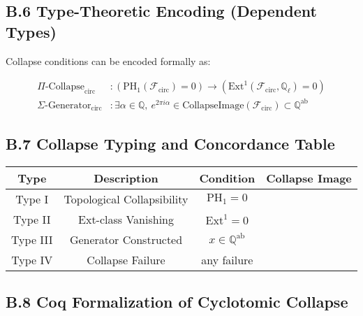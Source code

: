 \documentclass[11pt]{article}
\newcommand{\cmark}{\ding{51}}  %
\newcommand{\xmark}{\ding{55}}  %
\begin{document}
\subsection*{B.6 Type-Theoretic Encoding (Dependent Types)}

Collapse conditions can be encoded formally as:

\begin{align*}
\Pi\text{-Collapse}_{\mathrm{circ}} &: \left( \mathrm{PH}_1(\mathcal{F}_{\mathrm{circ}}) = 0 \right) \to \left( \mathrm{Ext}^1(\mathcal{F}_{\mathrm{circ}}, \mathbb{Q}_\ell) = 0 \right) \\
\Sigma\text{-Generator}_{\mathrm{circ}} &: \exists \alpha \in \mathbb{Q},\ e^{2\pi i \alpha} \in \text{CollapseImage}(\mathcal{F}_{\mathrm{circ}}) \subset \mathbb{Q}^{\mathrm{ab}}
\end{align*}

\subsection*{B.7 Collapse Typing and Concordance Table}

\begin{center}
\renewcommand{\arraystretch}{1.2}
\begin{tabular}{|c|c|c|c|}
\hline
\textbf{Type} & \textbf{Description} & \textbf{Condition} & \textbf{Collapse Image} \\
\hline
Type I & Topological Collapsibility & \( \mathrm{PH}_1 = 0 \) & \cmark \\
Type II & Ext-class Vanishing & \( \mathrm{Ext}^1 = 0 \) & \cmark \\
Type III & Generator Constructed & \( x \in \mathbb{Q}^{\mathrm{ab}} \) & \cmark \\
Type IV & Collapse Failure & any failure & \xmark \\
\hline
\end{tabular}
\end{center}

\subsection*{B.8 Coq Formalization of Cyclotomic Collapse}
\label{sec:coq-collapse-cyclo}
\end{document}
